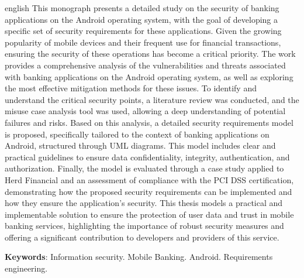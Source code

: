 \begin{resumo}[Abstract]
 \begin{otherlanguage*}{english}
This monograph presents a detailed study on the security of banking applications on the Android operating system, with the goal of developing a specific set of security requirements for these applications. Given the growing popularity of mobile devices and their frequent use for financial transactions, ensuring the security of these operations has become a critical priority. The work provides a comprehensive analysis of the vulnerabilities and threats associated with banking applications on the Android operating system, as well as exploring the most effective mitigation methods for these issues. To identify and understand the critical security points, a literature review was conducted, and the misuse case analysis tool was used, allowing a deep understanding of potential failures and risks. Based on this analysis, a detailed security requirements model is proposed, specifically tailored to the context of banking applications on Android, structured through UML diagrams. This model includes clear and practical guidelines to ensure data confidentiality, integrity, authentication, and authorization. Finally, the model is evaluated through a case study applied to Herd Financial and an assessment of compliance with the PCI DSS certification, demonstrating how the proposed security requirements can be implemented and how they ensure the application's security. This thesis models a practical and implementable solution to ensure the protection of user data and trust in mobile banking services, highlighting the importance of robust security measures and offering a significant contribution to developers and providers of this service.
   \vspace{\onelineskip}
 
   \noindent 
   \textbf{Keywords}: Information security. Mobile Banking. Android. Requirements engineering.
 \end{otherlanguage*}
\end{resumo}